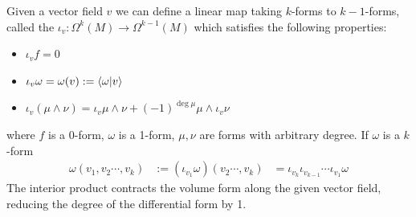 \documentclass[10pt]{article}
\begin{document}
\begin{definition}
	Given a vector field $v$ we can define a linear map taking $k$-forms to $k-1$-forms, called the  $\iota_v:\Omega^k(M)\to\Omega^{k-1}(M)$ which satisfies the following properties:
	\begin{itemize}
		\item $\iota_v f = 0$
		\item $\iota_v \omega = \omega(v) := \ip{\omega}{v}$ 
		\item $\iota_v (\mu\wedge\nu) = \iota_v \mu\wedge\nu + (-1)^{\deg \mu} \mu\wedge\iota_v\nu$ 
	\end{itemize}
	where $f$ is a 0-form, $\omega$ is a 1-form, $\mu,\nu$ are forms with arbitrary degree. If $\omega$ is a $k$-form
	$$
	\begin{aligned}
		\omega(v_1,v_2\cdots,v_k) &:= (\iota_{v_1}\omega)(v_2\cdots,v_k)
		&= \iota_{v_k}\iota_{v_{k-1}}\cdots\iota_{v_1}\omega
	\end{aligned}
	$$
	The interior product contracts the volume form along the given vector field, reducing the degree of the differential form by 1.
\end{definition}
\end{document}
